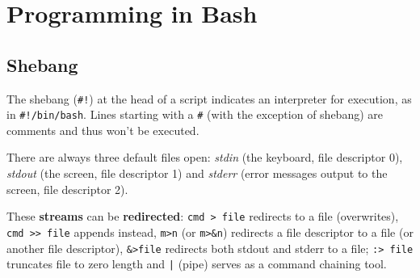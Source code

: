 \section{Programming in Bash}
\subsection{Shebang}
The shebang (\texttt{\#!}) at the head of a script indicates an 
interpreter for execution, as in \texttt{\#!/bin/bash}.
Lines starting with a \texttt{\#} (with the exception of shebang) 
are comments and thus won't be executed.

There are always three default files open:
\emph{stdin} (the keyboard, file descriptor 0),
\emph{stdout} (the screen, file descriptor 1) and
\emph{stderr} (error messages output to the screen, file descriptor 2).

These \textbf{streams} can be \textbf{redirected}: 
\texttt{cmd > file} redirects to a file (overwrites),
\texttt{cmd >{}> file} appends instead,
\texttt{m>n} (or \texttt{m>\&n}) redirects a file descriptor to a file 
(or another file descriptor), 
\texttt{\&>file} redirects both stdout and stderr to a file;
\texttt{:> file} truncates file to zero length and
\texttt{|} (pipe) serves as a command chaining tool.
